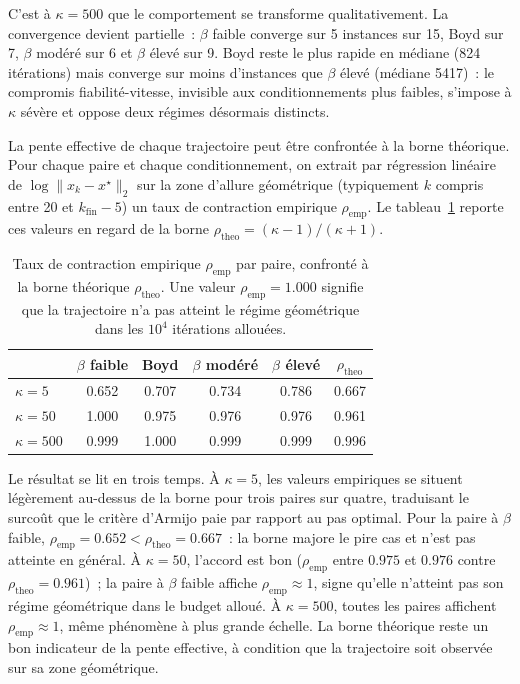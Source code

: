 \documentclass[10pt,a4paper]{article}
\begin{document}
C'est à $\kappa = 500$ que le comportement se transforme qualitativement. La convergence devient partielle~: $\beta$ faible converge sur 5 instances sur 15, Boyd sur 7, $\beta$ modéré sur 6 et $\beta$ élevé sur 9. Boyd reste le plus rapide en médiane (824 itérations) mais converge sur moins d'instances que $\beta$ élevé (médiane 5417)~: le compromis fiabilité-vitesse, invisible aux conditionnements plus faibles, s'impose à $\kappa$ sévère et oppose deux régimes désormais distincts.

La pente effective de chaque trajectoire peut être confrontée à la borne théorique. Pour chaque paire et chaque conditionnement, on extrait par régression linéaire de $\log \|x_k - x^\star\|_2$ sur la zone d'allure géométrique (typiquement $k$ compris entre 20 et $k_{\text{fin}} - 5$) un taux de contraction empirique $\rho_{\text{emp}}$. Le tableau~\ref{tab:rho} reporte ces valeurs en regard de la borne $\rho_{\text{theo}} = (\kappa - 1) / (\kappa + 1)$.

\begin{table}[htbp]
\centering
\small
\begin{tabular}{l|cccc|c}
\toprule
 & $\beta$ faible & Boyd & $\beta$ modéré & $\beta$ élevé & $\rho_{\text{theo}}$ \\
\midrule
$\kappa = 5$   & 0.652 & 0.707 & 0.734 & 0.786 & 0.667 \\
$\kappa = 50$  & 1.000 & 0.975 & 0.976 & 0.976 & 0.961 \\
$\kappa = 500$ & 0.999 & 1.000 & 0.999 & 0.999 & 0.996 \\
\bottomrule
\end{tabular}
\caption{Taux de contraction empirique $\rho_{\text{emp}}$ par paire, confronté à la borne théorique $\rho_{\text{theo}}$. Une valeur $\rho_{\text{emp}} = 1.000$ signifie que la trajectoire n'a pas atteint le régime géométrique dans les $10^4$ itérations allouées.}
\label{tab:rho}
\end{table}

Le résultat se lit en trois temps. À $\kappa = 5$, les valeurs empiriques se situent légèrement au-dessus de la borne pour trois paires sur quatre, traduisant le surcoût que le critère d'Armijo paie par rapport au pas optimal. Pour la paire à $\beta$ faible, $\rho_{\text{emp}} = 0.652 < \rho_{\text{theo}} = 0.667$~: la borne majore le pire cas et n'est pas atteinte en général. À $\kappa = 50$, l'accord est bon ($\rho_{\text{emp}}$ entre $0.975$ et $0.976$ contre $\rho_{\text{theo}} = 0.961$)~; la paire à $\beta$ faible affiche $\rho_{\text{emp}} \approx 1$, signe qu'elle n'atteint pas son régime géométrique dans le budget alloué. À $\kappa = 500$, toutes les paires affichent $\rho_{\text{emp}} \approx 1$, même phénomène à plus grande échelle. La borne théorique reste un bon indicateur de la pente effective, à condition que la trajectoire soit observée sur sa zone géométrique.
\end{document}

